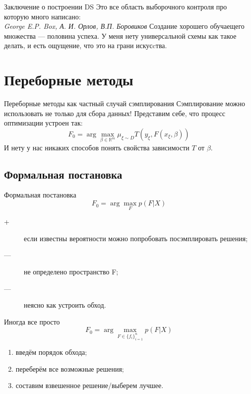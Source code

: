 \documentclass[14pt, fleqn, xcolor={dvipsnames, table}]{beamer}
\begin{document}
\begin{frame}{Заключение о построении DS}
Это все область выборочного контроля про которую много написано:\\
\textit{George E.P. Box, А. И. Орлов, В.П. Боровиков}
Создание хорошего обучаещего множества --- половина успеха. У меня нету универсальной схемы как такое делать, и есть ощущение, что это на грани искусcтва.
\end{frame}

\section{Переборные методы}

\begin{frame}{Переборные методы как частный случай сэмплирования}
Сэмплирование можно использовать не только для сбора данных! Представим себе, что процесс оптимизации устроен так:
$$
F_0 = \arg \max_{\beta \in \mathbb{R}^m} \mu_{\xi \sim D} T(y_{\xi}, F(x_{\xi}, \beta))
$$
И нету у нас никаких способов понять свойства зависимости $T$ от $\beta$.
\end{frame}

\subsection{Формальная постановка}
\begin{frame}{Формальная постановка}
$$
F_0 = \arg\max_F p(F|X)
$$
\begin{description}
  \item[\color{green}+] если известны вероятности можно попробовать посэмплировать решения;
  \item[\color{red}---] не определено пространство F;
  \item[\color{red}---] неясно как устроить обход.
\end{description}
\end{frame}

\begin{frame}{Иногда все просто}
$$
F_0 = \arg\max_{F \in \{f_i\}_{i=1}^n} p(F|X)
$$
\begin{enumerate}
  \item введём порядок обхода;
  \item переберём все возможные решения;
  \item составим взвешенное решение/выберем лучшее.
\end{enumerate}
\end{frame}
\end{document}
